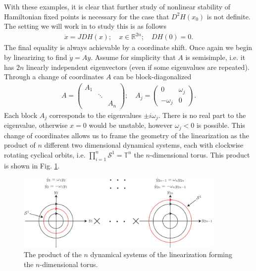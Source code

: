 With these examples, it is clear that further study of nonlinear stability of Hamiltonian fixed points is necessary for the case that $D^{2}H(x_0)$ is not definite. The setting we will work in to study this is as follows
\begin{align}
	\dot{x} = JDH(x);\quad x \in \mathbb{R}^{2n};\quad DH(0)=0.
\end{align}
The final equality is always achievable by a coordinate shift. Once again we begin by linearizing to find $\dot{y}=Ay$. Assume for simplicity that $A$ is semisimple, i.e. it has $2n$ linearly independent eigenvectors (even if some eigenvalues are repeated). Through a change of coordinates $A$ can be block-diagonalized
\begin{align}
	A = 
	\begin{pmatrix}
		A_1 & & \\
		    & \ddots & \\
		    & & A_n
	\end{pmatrix}
	;\quad A_{j} = 
	\begin{pmatrix}
		0 & \omega_j \\
		-\omega_j & 0
	\end{pmatrix}
	.
\end{align}
Each block $A_j$ corresponds to the eigenvalues $\pm i \omega _j$. There is no real part to the eigenvalue, otherwise $x=0$ would be unstable, however $\omega _j<0$ is possible. This change of coordinates allows us to frame the geometry of the linearization as the product of $n$ different two dimensional dynamical systems, each with clockwise rotating cyclical orbits, i.e. $\prod_{i=1}^{n}\mathcal{S}^{1}= \mathbb{T}^{n}$ the $n$-dimensional torus. This product is shown in Fig. \ref{fig:linearization_geometry}.
\begin{figure}[h!]
	\centering
	\includegraphics[width=0.9\textwidth]{figures/ch8/20linearization_geometry.pdf}
	\caption{The product of the $n$ dynamical systems of the linearization forming the $n$-dimensional torus.}
	\label{fig:linearization_geometry}
\end{figure}


